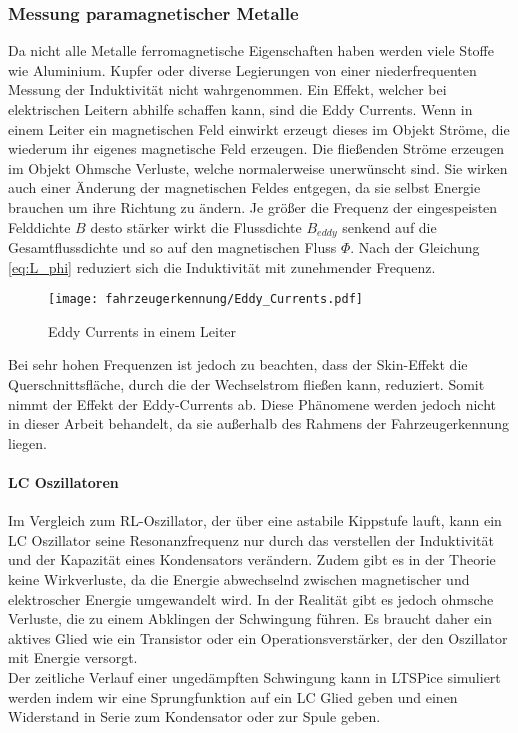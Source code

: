 \pagebreak
\subsubsection{Messung paramagnetischer Metalle}
Da nicht alle Metalle ferromagnetische Eigenschaften haben werden viele Stoffe wie Aluminium. Kupfer oder diverse Legierungen
von einer niederfrequenten Messung der Induktivität nicht wahrgenommen. Ein Effekt, welcher bei elektrischen Leitern abhilfe schaffen kann, sind 
die Eddy Currents. Wenn in einem Leiter ein magnetischen Feld einwirkt erzeugt dieses im Objekt Ströme, die wiederum ihr eigenes magnetische Feld erzeugen.
Die fließenden Ströme erzeugen im Objekt Ohmsche Verluste, welche normalerweise unerwünscht sind. Sie wirken auch einer Änderung der magnetischen Feldes entgegen,
da sie selbst Energie brauchen um ihre Richtung zu ändern. Je größer die Frequenz der eingespeisten Felddichte $B$ desto stärker wirkt die 
Flussdichte $B_{eddy}$ senkend auf die Gesamtflussdichte und so auf den magnetischen Fluss $\Phi$. 
Nach der Gleichung \ref{eq:L_phi} reduziert sich die Induktivität mit zunehmender Frequenz.


\begin{figure}[H]
    \centering
    \texttt{[image: fahrzeugerkennung/Eddy\_Currents.pdf]}
    \caption{Eddy Currents in einem Leiter}
\end{figure}

Bei sehr hohen Frequenzen ist jedoch zu beachten, dass der Skin-Effekt die Querschnittsfläche, durch die der Wechselstrom fließen kann,
reduziert. Somit nimmt der Effekt der Eddy-Currents ab. Diese Phänomene werden jedoch nicht in dieser Arbeit behandelt, da sie außerhalb des Rahmens der 
Fahrzeugerkennung liegen. 

\paragraph{LC Oszillatoren}\mbox{}

Im Vergleich zum RL-Oszillator, der über eine astabile Kippstufe lauft, kann ein LC Oszillator seine Resonanzfrequenz nur durch das verstellen der Induktivität und der Kapazität 
eines Kondensators verändern. Zudem gibt es in der Theorie keine Wirkverluste, da die Energie abwechselnd zwischen magnetischer und elektroscher Energie umgewandelt wird. In der Realität gibt es jedoch
ohmsche Verluste, die zu einem Abklingen der Schwingung führen. Es braucht daher ein aktives Glied wie ein Transistor oder ein Operationsverstärker, der den Oszillator mit Energie versorgt.
\\
Der zeitliche Verlauf einer ungedämpften Schwingung kann in LTSPice simuliert werden indem wir eine Sprungfunktion auf ein LC Glied geben und einen Widerstand in Serie zum Kondensator oder zur
Spule geben.

